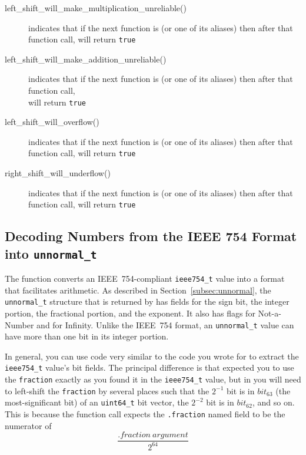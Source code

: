 \begin{itemize}
\begin{description}
        \item[left\_shift\_will\_make\_multiplication\_unreliable()] indicates that if the next function is  (or one of its aliases) then after that function call,  will return \lstinline{true}
        \item[left\_shift\_will\_make\_addition\_unreliable()] indicates that if the next function is  (or one of its aliases) then after that function call, \\  will return \lstinline{true}
        \item[left\_shift\_will\_overflow()] indicates that if the next function is  (or one of its aliases) then after that function call,  will return \lstinline{true}
        \item[right\_shift\_will\_underflow()] indicates that if the next function is  (or one of its aliases) then after that function call,  will return \lstinline{true}
    \end{description}
\end{itemize}

\subsection{Decoding Numbers from the IEEE 754 Format into \texttt{unnormal\_t}}

The  function converts an IEEE~754-compliant \lstinline{ieee754_t} value into a format that facilitates arithmetic.
As described in Section~\ref{subsec:unnormal}, the \lstinline{unnormal_t} structure that is returned by  has fields for the sign bit, the integer portion, the fractional portion, and the exponent.
It also has flags for Not-a-Number and for Infinity.
Unlike the IEEE~754 format, an \lstinline{unnormal_t} value can have more than one bit in its integer portion.

In general, you can use code very similar to the code you wrote for  to extract the \lstinline{ieee754_t} value's bit fields.
The principal difference is that  expected you to use the \lstinline{fraction} exactly as you found it in the \lstinline{ieee754_t} value,
but in  you will need to left-shift the \lstinline{fraction} by several places such that the $2^{-1}$ bit is in $bit_{63}$ (the most-significant bit) of an \lstinline{uint64_t} bit vector, the $2^{-2}$ bit is in $bit_{62}$, and so on.
This is because the  function call expects the \lstinline{.fraction} named field to be the numerator of
\[\frac{.fraction\ argument}{2^{64}}\]

